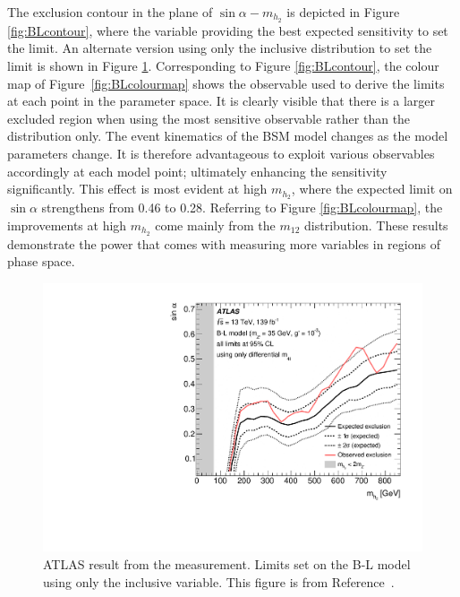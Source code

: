 The exclusion contour in the plane of $\sin\alpha-m_{h_2}$ is depicted in Figure \ref{fig:BLcontour}, where the variable providing the best expected sensitivity to set the limit. An alternate version using only the inclusive \mFourL{} distribution to set the limit is shown in Figure \ref{fig:BLcontourm4l}. Corresponding to Figure \ref{fig:BLcontour}, the colour map of Figure~\ref{fig:BLcolourmap} shows the observable used to derive the limits at each point in the parameter space. It is clearly visible that there is a larger excluded region when using the most sensitive observable rather than the \mFourL{} distribution only. The event kinematics of the BSM model changes as the model parameters change. It is therefore advantageous to exploit various observables accordingly at each model point; ultimately enhancing the sensitivity significantly. This effect is most evident at high $m_{h_2}$, where the expected limit on $\sin\alpha$ strengthens from 0.46 to 0.28. Referring to Figure \ref{fig:BLcolourmap}, the improvements at high $m_{h_2}$ come mainly from the $m_{12}$ distribution. These results demonstrate the power that comes with measuring more variables in regions of phase space. 
\begin{figure}
    \centering
    \includegraphics[width=\mediumfigwidth]{Figures/m4l/Interpretations/UpperLimitBandWithContour_2D_withTheoExcl_m4l.pdf}
    \caption{ATLAS result from the \mFourL{} measurement. Limits set on the B-L model using only the inclusive \mFourL{} variable. This figure is from Reference~\cite{m4l2021_paper}.}
    \label{fig:BLcontourm4l}
\end{figure}
